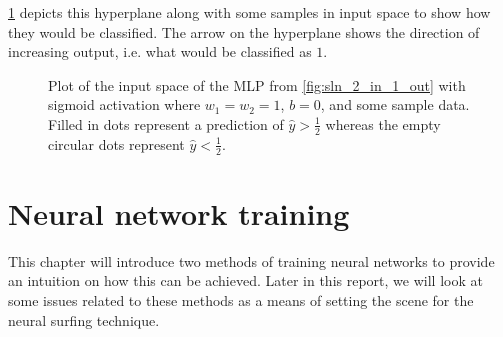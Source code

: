 \begin{example}
    \ref{fig:sigmoid_hyperplane} depicts this hyperplane along with some samples in input space to show how they would be classified. 
    The arrow on the hyperplane shows the direction of increasing output, i.e. what would be classified as $1$.
    \begin{figure}
        \centering
        \caption{Plot of the input space of the MLP from \ref{fig:sln_2_in_1_out} with sigmoid activation where $w_1=w_2=1$, $b=0$, and some sample data. Filled in dots represent a prediction of $\hat{y}>\frac{1}{2}$ whereas the empty circular dots represent $\hat{y}<\frac{1}{2}$.}
        \label{fig:sigmoid_hyperplane}
    \end{figure}
\end{example}

\chapter{Neural network training}
\label{chap:neural_training}
This chapter will introduce two methods of training neural networks to provide an intuition on how this can be achieved.
Later in this report, we will look at some issues related to these methods as a means of setting the scene for the neural surfing technique.

